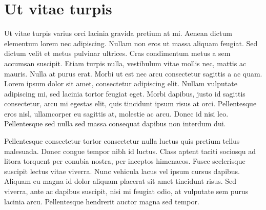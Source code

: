 \section{Ut vitae turpis}
\label{section:lipsum:ut}

Ut vitae turpis varius orci lacinia gravida pretium at mi. Aenean dictum elementum lorem nec adipiscing. Nullam non eros ut massa aliquam feugiat. Sed dictum velit et metus pulvinar ultrices. Cras condimentum metus a sem accumsan suscipit. Etiam turpis nulla, vestibulum vitae mollis nec, mattis ac mauris. Nulla at purus erat. Morbi ut est nec arcu consectetur sagittis a ac quam. Lorem ipsum dolor sit amet, consectetur adipiscing elit. Nullam vulputate adipiscing mi, sed lacinia tortor feugiat eget. Morbi dapibus, justo id sagittis consectetur, arcu mi egestas elit, quis tincidunt ipsum risus at orci. Pellentesque eros nisl, ullamcorper eu sagittis at, molestie ac arcu. Donec id nisi leo. Pellentesque sed nulla sed massa consequat dapibus non interdum dui.

Pellentesque consectetur tortor consectetur nulla luctus quis pretium tellus malesuada. Donec congue tempor nibh id luctus. Class aptent taciti sociosqu ad litora torquent per conubia nostra, per inceptos himenaeos. Fusce scelerisque suscipit lectus vitae viverra. Nunc vehicula lacus vel ipsum cursus dapibus. Aliquam eu magna id dolor aliquam placerat sit amet tincidunt risus. Sed viverra, ante ac dapibus suscipit, nisi mi feugiat odio, at vulputate sem purus lacinia arcu. Pellentesque hendrerit auctor magna sed tempor.

